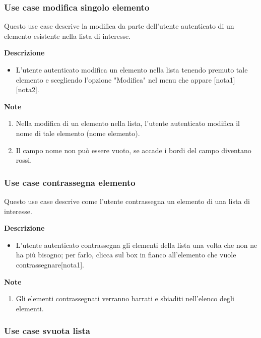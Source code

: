 \documentclass[a4paper,12pt]{article}
\begin{document}
\subsubsection*{Use case modifica singolo elemento}

Questo use case descrive la modifica da parte dell'utente autenticato di un elemento esistente nella lista di interesse.

\textbf{Descrizione}
\begin{itemize} \setlength\itemsep{0.01em}
\item L'utente autenticato modifica un elemento nella lista tenendo premuto tale elemento e scegliendo l'opzione "Modifica" nel menu che appare [nota1][nota2].
\end{itemize}

\textbf{Note}
\begin{enumerate} \setlength\itemsep{0.01em}
\item Nella modifica di un elemento nella lista, l'utente autenticato modifica il nome di tale elemento (nome elemento).
\item Il campo nome non può essere vuoto, se accade i bordi del campo diventano rossi.
\end{enumerate}




\subsubsection*{Use case contrassegna elemento}

Questo use case descrive come l'utente contrassegna un elemento di una lista di interesse.

\textbf{Descrizione}
\begin{itemize} \setlength\itemsep{0.01em}
\item L'utente autenticato contrassegna gli elementi della lista una volta che non ne ha più bisogno; per farlo, clicca sul box in fianco all'elemento che vuole contrassegnare[nota1].
\end{itemize}

\textbf{Note}
\begin{enumerate} \setlength\itemsep{0.01em}
\item Gli elementi contrassegnati verranno barrati e sbiaditi nell'elenco degli elementi.
\end{enumerate}



\subsubsection*{Use case svuota lista}
\end{document}
